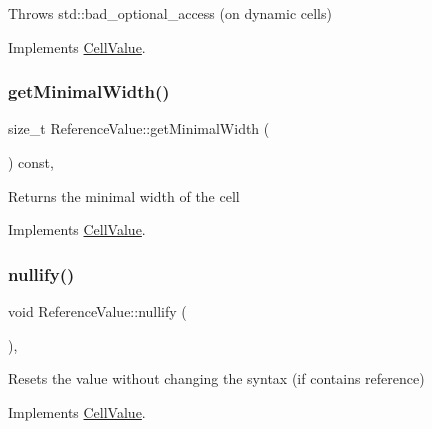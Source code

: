 Throws std\+::bad\+\_\+optional\+\_\+access (on dynamic cells) 

Implements \hyperlink{classCellValue_a3d2850b3a8473050fd46f486a29ed5bf}{Cell\+Value}.

\mbox{\label{classReferenceValue_a5d4898e7695e098c1e6b26dfdcddbac2}} 
\subsubsection{\texorpdfstring{get\+Minimal\+Width()}{getMinimalWidth()}}
{\footnotesize\ttfamily size\+\_\+t Reference\+Value\+::get\+Minimal\+Width (\begin{DoxyParamCaption}{ }\end{DoxyParamCaption}) const\hspace{0.3cm}{\ttfamily [override]}, {\ttfamily [virtual]}}

Returns the minimal width of the cell 

Implements \hyperlink{classCellValue_ad96473ba3dd88b83da96c03ae31a2ede}{Cell\+Value}.

\mbox{\label{classReferenceValue_ad8d2f9ed510ea8d0c5076089dd52c998}} 
\subsubsection{\texorpdfstring{nullify()}{nullify()}}
{\footnotesize\ttfamily void Reference\+Value\+::nullify (\begin{DoxyParamCaption}{ }\end{DoxyParamCaption})\hspace{0.3cm}{\ttfamily [override]}, {\ttfamily [virtual]}}

Resets the value without changing the syntax (if contains reference) 

Implements \hyperlink{classCellValue_af4f30a4b36e159f2f2bfc7ed83f1b37a}{Cell\+Value}.

\mbox{\label{classReferenceValue_ac8f0e1ec9b046692e551fc509e71d150}} 
